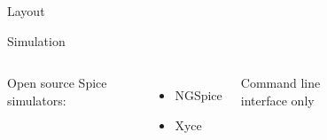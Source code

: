 \documentclass[10pt]{beamer}
\begin{document}
\begin{frame}{Layout}

\begin{figure}[h]
\end{figure}


\end{frame}


\begin{frame}{Simulation}

\begin{columns}

Open source Spice simulators:
\begin{itemize}
\item NGSpice
\item Xyce
\end{itemize}

Command line interface only


\begin{figure}[h]
\end{figure}

\end{columns}
\end{frame}
\end{document}
